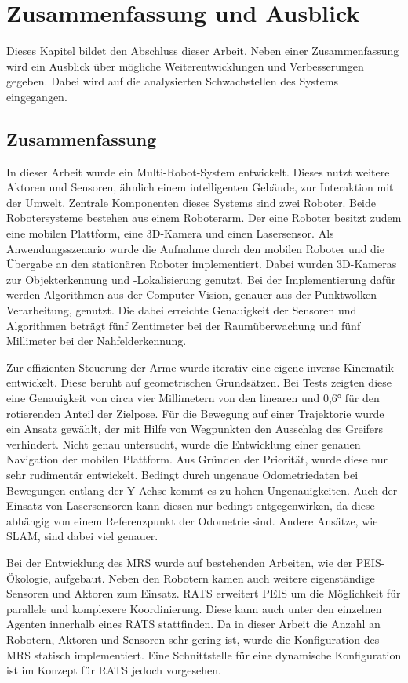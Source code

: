 \section{Zusammenfassung und Ausblick}
\label{sec:end}
Dieses Kapitel bildet den Abschluss dieser Arbeit.  Neben einer Zusammenfassung wird ein Ausblick über mögliche Weiterentwicklungen und Verbesserungen gegeben. Dabei wird auf die analysierten Schwachstellen des Systems eingegangen.

\subsection{Zusammenfassung}
In dieser Arbeit wurde ein Multi-Robot-System entwickelt. Dieses nutzt weitere Aktoren und Sensoren, ähnlich einem intelligenten Gebäude, zur Interaktion mit der Umwelt. Zentrale Komponenten dieses Systems sind zwei Roboter. Beide Robotersysteme bestehen aus einem Roboterarm. Der eine Roboter besitzt zudem eine mobilen Plattform, eine 3D-Kamera und einen Lasersensor. Als Anwendungsszenario wurde die Aufnahme durch den mobilen Roboter und die Übergabe an den stationären Roboter implementiert. Dabei wurden 3D-Kameras zur Objekterkennung und -Lokalisierung genutzt. Bei der Implementierung dafür werden Algorithmen aus der Computer Vision, genauer aus der Punktwolken Verarbeitung, genutzt. Die dabei erreichte Genauigkeit der Sensoren und Algorithmen beträgt fünf Zentimeter bei der Raumüberwachung und fünf Millimeter bei der Nahfelderkennung. 

Zur effizienten Steuerung der Arme wurde iterativ eine eigene inverse Kinematik entwickelt. Diese beruht auf geometrischen Grundsätzen. Bei Tests zeigten diese eine Genauigkeit von circa vier Millimetern von den linearen und 0,6° für den rotierenden Anteil der Zielpose. Für die Bewegung auf einer Trajektorie wurde ein Ansatz gewählt, der mit Hilfe von Wegpunkten den Ausschlag des Greifers verhindert. Nicht genau untersucht, wurde die Entwicklung einer genauen Navigation der mobilen Plattform. Aus Gründen der Priorität, wurde diese nur sehr rudimentär entwickelt. Bedingt durch ungenaue Odometriedaten bei Bewegungen entlang der Y-Achse kommt es zu hohen Ungenauigkeiten. Auch der Einsatz von Lasersensoren kann diesen nur bedingt entgegenwirken, da diese abhängig von einem Referenzpunkt der Odometrie sind. Andere Ansätze, wie SLAM, sind dabei viel genauer.

 Bei der Entwicklung des MRS wurde auf bestehenden Arbeiten, wie der PEIS-Ökologie, aufgebaut. Neben den Robotern kamen auch weitere eigenständige Sensoren und Aktoren zum Einsatz. RATS erweitert PEIS um die Möglichkeit für parallele und komplexere Koordinierung. Diese kann auch unter den einzelnen Agenten innerhalb eines RATS stattfinden. Da in dieser Arbeit die Anzahl an Robotern, Aktoren und Sensoren sehr gering ist, wurde die Konfiguration des MRS statisch implementiert. Eine Schnittstelle für eine dynamische Konfiguration ist im Konzept für RATS jedoch vorgesehen.

